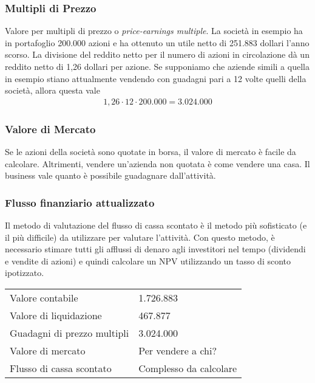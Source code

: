 \documentclass[a4paper,portrait,12pt]{article}
\theoremstyle{definition}
\begin{document}
\subsubsection{Multipli di Prezzo}

Valore per multipli di prezzo o \emph{price-earnings multiple}.
La società in esempio ha in portafoglio 200.000 azioni e ha ottenuto un utile netto di 251.883 dollari l'anno scorso.
La divisione del reddito netto per il numero di azioni in circolazione dà un reddito netto di 1,26 dollari per azione.
Se supponiamo che aziende simili a quella in esempio stiano attualmente vendendo con guadagni pari a 12 volte quelli della società, allora questa	 vale
\begin{align*}
1,26 \cdot 12 \cdot 200.000 = 3.024.000
\end{align*}

\subsubsection{Valore di Mercato}

Se le azioni della società sono quotate in borsa, il valore di mercato è facile da calcolare.
Altrimenti, vendere un'azienda non quotata è come vendere una casa.
Il business vale quanto è possibile guadagnare dall'attività.

\subsubsection{Flusso finanziario attualizzato}

Il metodo di valutazione del flusso di cassa scontato è il metodo più sofisticato (e il più difficile) da utilizzare per valutare l'attività.
Con questo metodo, è necessario stimare tutti gli afflussi di denaro agli investitori nel tempo (dividendi e vendite di azioni) e quindi calcolare un NPV utilizzando un tasso di sconto ipotizzato.


\begin{table}[H]
\begin{center}
\begin{tabular}{ll}
Valore contabile & 1.726.883\\
Valore di liquidazione & 467.877\\
Guadagni di prezzo multipli & 3.024.000\\
Valore di mercato & Per vendere a chi?\\
Flusso di cassa scontato & Complesso da calcolare
\end{tabular}
\end{center}
\end{table}
\end{document}
